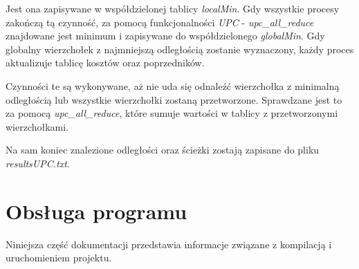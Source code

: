 \documentclass[12pt]{article}
\begin{document}
 Jest ona zapisywane w współdzielonej tablicy \textit{localMin}. Gdy wszystkie procesy zakończą tą czynność, za pomocą funkcjonalności \textit{UPC} - \textit{upc\_all\_reduce} znajdowane jest minimum i zapisywane do współdzielonego \textit{globalMin}. Gdy globalny wierzchołek z najmniejszą odległością zostanie wyznaczony, każdy proces aktualizuje tablicę kosztów oraz poprzedników.

Czynności te są wykonywane, aż nie uda się odnaleźć wierzchołka z minimalną odległością lub wszystkie wierzchołki zostaną przetworzone. Sprawdzane jest to za pomocą \textit{upc\_all\_reduce}, które sumuje wartości w tablicy z przetworzonymi wierzchołkami.

Na sam koniec znalezione odległości oraz ścieżki zostają zapisane do pliku \textit{resultsUPC.txt}.

\clearpage
\section{Obsługa programu}
Niniejsza część dokumentacji przedstawia informacje związane z kompilacją i uruchomieniem projektu.
\end{document}
